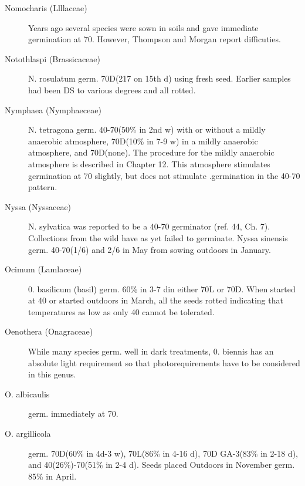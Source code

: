 \begin{description}
\item[Nomocharis (Llllaceae)] Years ago several species were sown in soils and
gave immediate germination at 70. However, Thompson and Morgan report difficuties.
\item[Notothlaspi (Brassicaceae)] N. rosulatum germ. 70D(217 on 15th d) using
fresh seed. Earlier samples had been DS to various degrees and all rotted.
\item[Nymphaea (Nymphaeceae)] N. tetragona germ. 40-70(50\% in 2nd w) with
or without a mildly anaerobic atmosphere, 70D(10\% in 7-9 w) in a mildly anaerobic
atmosphere, and 70D(none). The procedure for the mildly anaerobic atmosphere is
described in Chapter 12. This atmosphere stimulates germination at 70 slightly, but
does not stimulate .germination in the 40-70 pattern.
\item[Nyssa (Nyssaceae)] N. sylvatica was reported to be a 40-70 germinator (ref.
44, Ch. 7). Collections from the wild have as yet failed to germinate. Nyssa sinensis
germ. 40-70(1/6) and 2/6 in May from sowing outdoors in January.

\item[Ocimum (Lamlaceae)] 0. basilicum (basil) germ. 60\% in 3-7 din either 70L
or 70D. When started at 40 or started outdoors in March, all the seeds rotted indicating
that temperatures as low as only 40 cannot be tolerated.
\item[Oenothera (Onagraceae)] While many species germ. well in dark
treatments, 0. biennis has an absolute light requirement so that photorequirements
have to be considered in this genus.
\item[O. albicaulis] germ. immediately at 70.
\item[O. argillicola] germ. 70D(60\% in 4d-3 w), 70L(86\% in 4-16 d), 70D GA-3(83\% in
2-18 d), and 40(26\%)-70(51\% in 2-4 d). Seeds placed Outdoors in November germ.
85\% in April.


\end{description}
